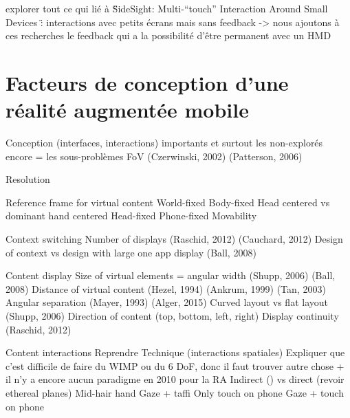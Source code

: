 explorer tout ce qui lié à \"SideSight: Multi-“touch” Interaction Around Small Devices \" : interactions avec petits écrans mais sans feedback -> nous ajoutons à ces recherches le feedback qui a la possibilité d'être permanent avec un HMD


\section*{Facteurs de conception d'une réalité augmentée mobile}
Conception (interfaces, interactions) importants et surtout les non-explorés encore = les sous-problèmes
        FoV (Czerwinski, 2002) (Patterson, 2006) \cite{KishishitaKiyokawaOrloskyEtAl2014} 

        Resolution 

        Reference frame for virtual content 
            World-fixed \cite{EnsFinneganIrani2014} 
            Body-fixed \cite{EnsFinneganIrani2014} 
                Head centered vs dominant hand centered 
            Head-fixed \cite{EnsFinneganIrani2014} 
            Phone-fixed
            Movability \cite{EnsHincapie-RamosIrani2014}

        Context switching 
            Number of displays (Raschid, 2012) (Cauchard, 2012) 
            Design of context vs design with large one app display (Ball, 2008) 

        Content display
            Size of virtual elements = angular width (Shupp, 2006) (Ball, 2008) 
            Distance of virtual content (Hezel, 1994) (Ankrum, 1999) (Tan, 2003) \cite{ChanKaoChenEtAl2010} \cite{EnsFinneganIrani2014} 
            Angular separation (Mayer, 1993) \cite{EnsFinneganIrani2014} \cite{KishishitaKiyokawaOrloskyEtAl2014} (Alger, 2015) 
            Curved layout vs flat layout (Shupp, 2006) 
            Direction of content (top, bottom, left, right) \cite{EnsFinneganIrani2014} 
            Display continuity \cite{TanCzerwinski2003} (Raschid, 2012)

        Content interactions
        	Reprendre \cite{Bernatchez2008}
        	Technique (interactions spatiales)
	        	Expliquer que c'est difficile de faire du WIMP ou du 6 DoF, donc il faut trouver autre chose \citet{AzumaBaillotBehringerEtAl2001} + il n'y a encore aucun paradigme en 2010 pour la RA \cite{VanKrevelenPoelman2010}
	        	Indirect (\cite{TeatherStuerzlinger2011}) vs direct (revoir ethereal planes)
	            Mid-hair hand \cite{EnsFinneganIrani2014} \cite{ChanKaoChenEtAl2010} \cite{JonesSodhiForsythEtAl2012}
	            Gaze + taffi 
	            Only touch on phone 
	            Gaze + touch on phone

